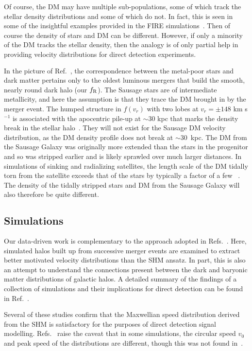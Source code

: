 \documentclass[prd,10pt,twocolumn,showpacs,nofootinbib, aps,superscriptaddress,preprintnumbers]{revtex4-1}
\newcommand{\fR}{f_{\rm R}}
\begin{document}
Of course, the DM may have multiple sub-populations, some of which
track the stellar density distributions and some of which do not. In
fact, this is seen in some of the insightful examples provided in the
FIRE simulations~\cite{Fire18}. Then of course the density of stars
and DM can be different. However, if only a minority of the DM tracks
the stellar density, then the analogy is of only partial help in
providing velocity distributions for direct detection experiments.

In the picture of Ref.~\cite{Necib:2018iwb}, the correspondence
between the metal-poor stars and dark matter pertains only to the
oldest luminous mergers that build the smooth, nearly round dark halo
(our $\fR$).  The Sausage stars are of intermediate metallicity, and
here the assumption is that they trace the DM brought in by the merger
event.  The humped structure in $f(v_r)$ with two lobes at $v_r = \pm
148$ km s$^{-1}$ is associated with the apocentric pile-up at $\sim
30$ kpc that marks the density break in the stellar
halo~\cite{Lancaster:2018}.  They will not exist for the Sausage DM
velocity distribution, as the DM density profile does not break at
$\sim 30$~kpc.  The DM from the Sausage Galaxy was originally more
extended than the stars in the progenitor and so was stripped earlier
and is likely sprawled over much larger distances.  In simulations of
sinking and radializing satellites, the length scale of the DM tidally
torn from the satellite exceeds that of the stars by typically a
factor of a few ~\cite[e.g.,][]{Am17,Fa18}. The density of the tidally
stripped stars and DM from the Sausage Galaxy will also therefore be
quite different.


\subsection{Simulations}
Our data-driven work is complementary to the approach
adopted in Refs.~\cite{Bozorgnia:2016ogo,Kelso:2016qqj,Sloane:2016kyi,Lentz:2017aay}. 
Here, simulated halos built up from successive merger events are examined to
extract better motivated velocity distributions than the SHM
ansatz. In part, this is also an attempt to understand the connections
present between the dark and baryonic matter distributions
of galactic halos. A detailed summary of the findings of a collection of 
simulations and their implications for direct detection can be found
in Ref.~\cite{Bozorgnia:2017brl}.

Several of these studies confirm that the Maxwellian speed
distribution derived from the SHM is satisfactory for the purposes of
direct detection signal modelling.
Refs.~\cite{Bozorgnia:2016ogo,Bozorgnia:2017brl} raise the caveat that
in some simulations, the circular speed $v_0$ and peak speed of the
distributions are different, though this was not found
in~\cite{Kelso:2016qqj}.
\end{document}
